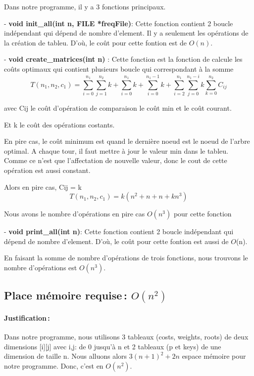 \documentclass{article}
\begin{document}
    Dans notre programme, il y a 3 fonctions principaux.
    
    - \textbf{void init\_all(int n, FILE *freqFile)}: Cette fonction contient 2 boucle indépendant qui dépend de nombre d'element. Il y a seulement les opérations de la création de tableu. D'où, le coût pour cette fontion est de $O(n)$.
    
    - \textbf{void create\_matrices(int n)} : Cette fonction est la fonction de calcule les coûts optimaux qui contient plusieurs boucle qui correspondant à la somme 
    $$T(n_1, n_2, c_1) = \sum_{i=0}^{n_1}\sum_{j=1}^{n_2}k + \sum_{i=0}^{n_1}k + \sum_{i=0}^{n_1 - 1}k + \sum_{i=2}^{n_1}\sum_{j=0}^{n_1 - i}k\sum_{k=0}^{n_2}C_{ij}$$ 
    
    avec Cij le coût d'opération de comparaison le coût min et le coût courant.
    
    Et k le coût des opérations costants.
    
    En pire cas, le coût minimum est quand le dernière noeud est le noeud de l'arbre optimal. A chaque tour, il faut mettre à jour le valeur min dans le tableu. Comme ce n'est que l'affectation de nouvelle valeur, donc le cout de cette opération est aussi constant.
    
    Alors en pire cas, Cij = k
    $$T(n_1, n_2, c_1) = k( n^2 + n + n + kn^3) $$
    
    Nous avons le nombre d'opérations en pire cas  $O(n^3)$ pour cette fonction 
    
    - \textbf{void print\_all(int n)}: Cette fonction contient 2 boucle indépendant qui dépend de nombre d'element. D'où, le coût pour cette fontion est aussi de $O$(n).
    
    En faisant la somme de nombre d'opérations de trois fonctions, nous trouvons le nombre d'opérations est $O(n^3)$.
  \subsection{Place mémoire requise\,: $O(n^2)$}
    \paragraph{Justification\,: }
    
    Dans notre programme, nous utilisons 3 tableaux (costs, weights, roots) de deux dimensions [i][j] avec i,j: de 0 jusqu'à n et 2 tableaux (p et keys) de une dimension de taille n.   
    Nous alluons alors $3(n+1)^2 + 2n$ espace mémoire pour notre programme. Donc, c'est en $O(n^2)$.
\end{document}

